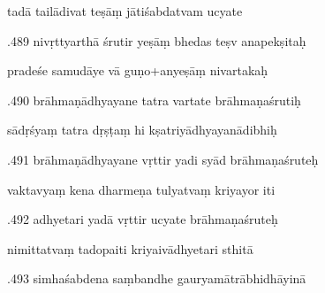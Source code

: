 \documentclass[article,12pt,a4paper]{memoir}%
\newcounter{parCount}
\begin{document}
	  
	  \pstart \leavevmode%
	tadā tailādivat teṣāṃ jātiśabdatvam ucyate 
	{}
	\pend%
      

	  
	  \pstart {}.489 nivṛttyarthā śrutir yeṣāṃ bhedas teṣv anapekṣitaḥ 
	{}
	\pend%
      

	  
	  \pstart \leavevmode%
	pradeśe samudāye vā guṇo+anyeṣāṃ nivartakaḥ 
	{}
	\pend%
      

	  
	  \pstart {}.490 brāhmaṇādhyayane tatra vartate brāhmaṇaśrutiḥ 
	{}
	\pend%
      

	  
	  \pstart \leavevmode%
	sādṛśyaṃ tatra dṛṣṭaṃ hi kṣatriyādhyayanādibhiḥ 
	{}
	\pend%
      

	  
	  \pstart {}.491 brāhmaṇādhyayane vṛttir yadi syād brāhmaṇaśruteḥ 
	{}
	\pend%
      

	  
	  \pstart \leavevmode%
	vaktavyaṃ kena dharmeṇa tulyatvaṃ kriyayor iti 
	{}
	\pend%
      

	  
	  \pstart {}.492 adhyetari yadā vṛttir ucyate brāhmaṇaśruteḥ 
	{}
	\pend%
      

	  
	  \pstart \leavevmode%
	nimittatvaṃ tadopaiti kriyaivādhyetari sthitā 
	{}
	\pend%
      

	  
	  \pstart {}.493 simhaśabdena saṃbandhe   gauryamātrābhidhāyinā 
	{}
	\pend%
      
\end{document}
